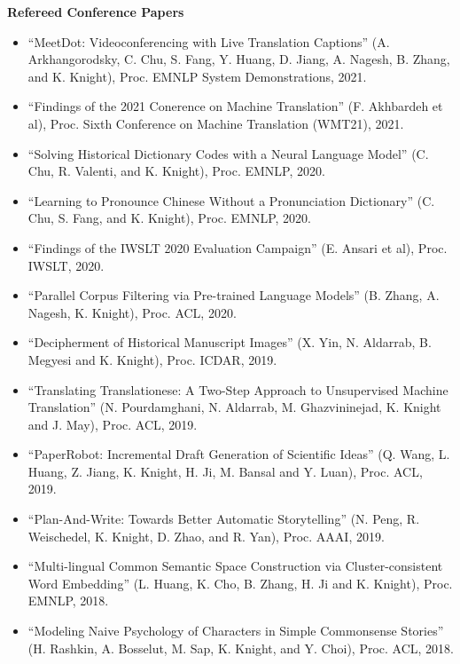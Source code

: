 \noindent
{\bf Refereed Conference Papers}
\begin{itemize}
\item ``MeetDot: Videoconferencing with Live Translation Captions'' (A. Arkhangorodsky, C. Chu, S. Fang, Y. Huang, D. Jiang, A. Nagesh, B. Zhang, and K. Knight), Proc. EMNLP System Demonstrations, 2021.

\item ``Findings of the 2021 Conerence on Machine Translation'' (F. Akhbardeh et al), Proc. Sixth Conference on Machine Translation (WMT21), 2021.

\item ``Solving Historical Dictionary Codes with a Neural Language Model'' (C. Chu, R. Valenti, and K. Knight), Proc. EMNLP, 2020. 

\item ``Learning to Pronounce Chinese Without a Pronunciation Dictionary'' (C. Chu, S. Fang, and K. Knight), Proc. EMNLP, 2020. 

\item ``Findings of the IWSLT 2020 Evaluation Campaign'' (E. Ansari et al), Proc. IWSLT, 2020. 

\item ``Parallel Corpus Filtering via Pre-trained Language Models'' (B. Zhang, A. Nagesh, K. Knight), Proc. ACL, 2020. 

\item ``Decipherment of Historical Manuscript Images'' (X. Yin, N. Aldarrab, B. Megyesi and K. Knight), Proc. ICDAR, 2019. 
\item ``Translating Translationese: A Two-Step Approach to Unsupervised Machine Translation'' (N. Pourdamghani, N. Aldarrab, M. Ghazvininejad, K. Knight and J. May), Proc. ACL, 2019. 

\item ``PaperRobot: Incremental Draft Generation of Scientific Ideas'' (Q. Wang, L. Huang, Z. Jiang, K. Knight, H. Ji, M. Bansal and Y. Luan), Proc. ACL, 2019. 

\item ``Plan-And-Write: Towards Better Automatic Storytelling'' (N. Peng, R. Weischedel, K. Knight, D. Zhao, and R. Yan), Proc. AAAI, 2019. 

\item ``Multi-lingual Common Semantic Space Construction via Cluster-consistent Word Embedding'' (L. Huang, K. Cho, B. Zhang, H. Ji and K. Knight), Proc. EMNLP, 2018. 

\item ``Modeling Naive Psychology of Characters in Simple Commonsense Stories'' (H. Rashkin, A. Bosselut, M. Sap, K. Knight, and Y. Choi), Proc. ACL, 2018.


\end{itemize}
